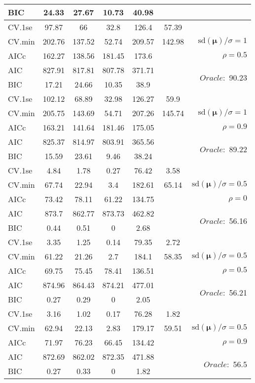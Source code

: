 \begin{table}
\begin{center}
\begin{tabular}{l*{5}{c}|r}
BIC & 24.33 & 27.67 & 10.73 & 40.98 & &  \\
 \hline 
CV.1se & 97.87 & 66 & 32.8 & 126.4 & 57.39 & \\
CV.min & 202.76 & 137.52 & 52.74 & 209.57 & 142.98 &  $\mathrm{sd}(\mathbf{\mu})/\sigma=1$ \\
AICc & 162.27 & 138.56 & 181.45 & 173.6 & & $\rho=0.5$ \\
AIC & 827.91 & 817.81 & 807.78 & 371.71 & &  \multirow{2}{*}{$Oracle: $ 90.23} \\
BIC & 17.21 & 24.66 & 10.35 & 38.9 & &  \\
 \hline 
CV.1se & 102.12 & 68.89 & 32.98 & 126.27 & 59.9 & \\
CV.min & 205.75 & 143.69 & 54.71 & 207.26 & 145.74 &  $\mathrm{sd}(\mathbf{\mu})/\sigma=1$ \\
AICc & 163.21 & 141.64 & 181.46 & 175.05 & & $\rho=0.9$ \\
AIC & 825.37 & 814.97 & 803.91 & 365.56 & &  \multirow{2}{*}{$Oracle: $ 89.22} \\
BIC & 15.59 & 23.61 & 9.46 & 38.24 & &  \\
 \hline 
CV.1se & 4.84 & 1.78 & 0.27 & 76.42 & 3.58 & \\
CV.min & 67.74 & 22.94 & 3.4 & 182.61 & 65.14 &  $\mathrm{sd}(\mathbf{\mu})/\sigma=0.5$ \\
AICc & 73.42 & 78.11 & 61.22 & 134.75 & & $\rho=0$ \\
AIC & 873.7 & 862.77 & 873.73 & 462.82 & &  \multirow{2}{*}{$Oracle: $ 56.16} \\
BIC & 0.44 & 0.51 & 0 & 2.68 & &  \\
 \hline 
CV.1se & 3.35 & 1.25 & 0.14 & 79.35 & 2.72 & \\
CV.min & 61.22 & 21.26 & 2.7 & 184.1 & 58.35 &  $\mathrm{sd}(\mathbf{\mu})/\sigma=0.5$ \\
AICc & 69.75 & 75.45 & 78.41 & 136.51 & & $\rho=0.5$ \\
AIC & 874.96 & 864.43 & 874.21 & 477.01 & &  \multirow{2}{*}{$Oracle: $ 56.21} \\
BIC & 0.27 & 0.29 & 0 & 2.05 & &  \\
 \hline 
CV.1se & 3.16 & 1.02 & 0.17 & 76.28 & 1.82 & \\
CV.min & 62.94 & 22.13 & 2.83 & 179.17 & 59.51 &  $\mathrm{sd}(\mathbf{\mu})/\sigma=0.5$ \\
AICc & 71.97 & 76.23 & 66.45 & 134.42 & & $\rho=0.9$ \\
AIC & 872.69 & 862.02 & 872.35 & 471.88 & &  \multirow{2}{*}{$Oracle: $ 56.5} \\
BIC & 0.27 & 0.33 & 0 & 1.82 & &  \\
 \hline 
\end{tabular}
\end{center}
\vspace{-1cm}
\end{table}




